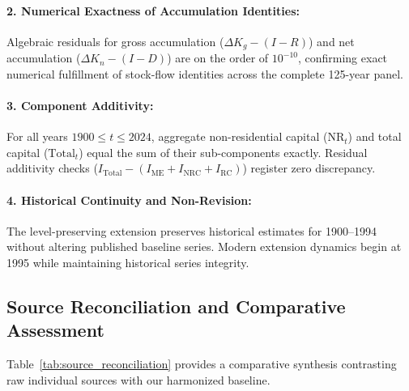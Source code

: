 \paragraph{2. Numerical Exactness of Accumulation Identities:}
Algebraic residuals for gross accumulation ($\Delta K_g - (I - R)$) and net accumulation ($\Delta K_n - (I - D)$) are on the order of $10^{-10}$, confirming exact numerical fulfillment of stock-flow identities across the complete 125-year panel.

\paragraph{3. Component Additivity:}
For all years $1900 \le t \le 2024$, aggregate non-residential capital ($\text{NR}_t$) and total capital ($\text{Total}_t$) equal the sum of their sub-components exactly. Residual additivity checks ($I_{\text{Total}} - (I_{\text{ME}} + I_{\text{NRC}} + I_{\text{RC}})$) register zero discrepancy.

\paragraph{4. Historical Continuity and Non-Revision:}
The level-preserving extension preserves historical estimates for 1900--1994 without altering published baseline series. Modern extension dynamics begin at 1995 while maintaining historical series integrity.

\subsection{Source Reconciliation and Comparative Assessment}
Table~\ref{tab:source_reconciliation} provides a comparative synthesis contrasting raw individual sources with our harmonized baseline.

